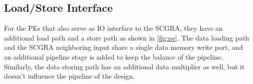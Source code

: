 \subsection{Load/Store Interface}
For the PEs that also serve as IO interface to the SCGRA, they have an additional load path and a store path as shown in \ref{fig:pe}. The data loading path and the SCGRA neighboring input share a single data memory write port, and an additional pipeline stage is added to keep the balance of the pipeline.
Similarly, the data storing path has an additional data multiplier as well, but it doesn't influence the pipeline of the design. 



